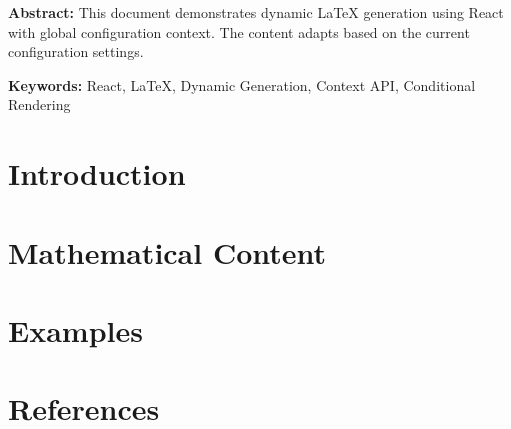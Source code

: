\documentclass{article}
\begin{document}
\textbf{Abstract:} This document demonstrates dynamic LaTeX generation using React with global configuration context. The content adapts based on the current configuration settings.

\textbf{Keywords:} React, LaTeX, Dynamic Generation, Context API, Conditional Rendering

\section{Introduction}

\section{Mathematical Content}


\section{Examples}


\section{References}
\end{document}
